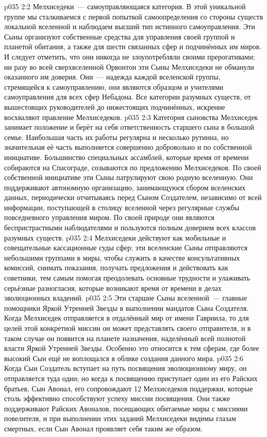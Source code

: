 \vs p035 2:2 Мелхиседеки~--- самоуправляющаяся категория. В этой уникальной группе мы сталкиваемся с первой попыткой самоопределения со стороны существ локальной вселенной и наблюдаем высший тип истинного самоуправления. Эти Сыны организуют собственные средства для управления своей группой и планетой обитания, а также для шести связанных сфер и подчинённых им миров. И следует отметить, что они никогда не злоупотребляли своими прерогативами; ни разу во всей сверхвселенной Орвонтон эти Сыны Мелхиседеки не обманули оказанного им доверия. Они~--- надежда каждой вселенской группы, стремящейся к самоуправлению, они являются образцом и учителями самоуправления для всех сфер Небадона. Все категории разумных существ, от вышестоящих руководителей до нижестоящих подчинённых, искренне восхваляют правление Мелхиседеков.
\vs p035 2:3 \pc Категория сыновства Мелхиседек занимает положение и берёт на себя ответственность старшего сына в большой семье. Наибольшая часть их работы регулярна и несколько рутинна, но значительная её часть выполняется совершенно добровольно и по собственной инициативе. Большинство специальных ассамблей, которые время от времени собираются на Спасограде, созываются по предложению Мелхиседеков. По своей собственной инициативе эти Сыны патрулируют свою родную вселенную. Они поддерживают автономную организацию, занимающуюся сбором вселенских данных, периодически отчитываясь перед Сыном Создателем, независимо от всей информации, поступающей в столицу вселенной через регулярные службы повседневного управления миром. По своей природе они являются беспристрастными наблюдателями и пользуются полным доверием всех классов разумных существ.
\vs p035 2:4 Мелхиседеки действуют как мобильные и совещательные кассационные суды сфер; эти вселенские Сыны отправляются небольшими группами в миры, чтобы служить в качестве консультативных комиссий, снимать показания, получать предложения и действовать как советники, тем самым помогая преодолевать основные трудности и улаживать серьёзные разногласия, которые возникают время от времени в делах эволюционных владений.
\vs p035 2:5 Эти старшие Сыны вселенной~--- главные помощники Яркой Утренней Звезды в выполнении мандатов Сына Создателя. Когда Мелхиседек отправляется в отдалённый мир от имени Гавриила, то для целей этой конкретной миссии он может представлять своего отправителя, и в таком случае он появится на планете назначения, наделённый всей полнотой власти Яркой Утренней Звезды. Особенно это относится к тем сферам, где более высокий Сын ещё не воплощался в облике создания данного мира.
\vs p035 2:6 Когда Сын Создатель вступает на путь посвящения эволюционному миру, он отправляется туда один; но когда к посвящению приступает один из его Райских братьев, Сын Авонал, его сопровождают 12 Мелхиседеков поддержки, которые столь эффективно способствуют успеху миссии посвящения. Они также поддерживают Райских Авоналов, посещающих обитаемые миры с миссиями повелителя, и при выполнении этих заданий Мелхиседеки видимы глазам смертных, если Сын Авонал проявляет себя таким же образом.
